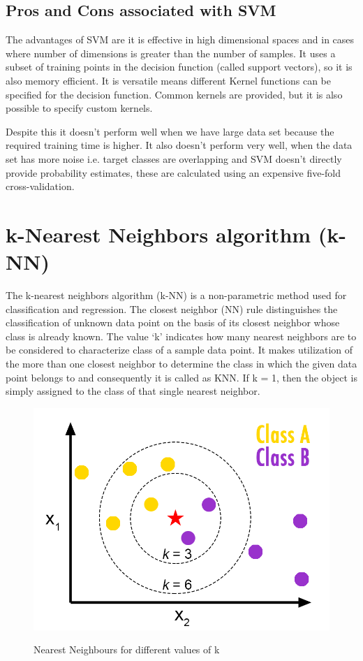 \subsection{Pros and Cons associated with SVM} \label{Pros and Cons associated with SVM}

\noindent The advantages of SVM are it is effective in high dimensional spaces and in cases where number of dimensions is greater than the number of samples. It uses a subset of training points in the decision function (called support vectors), so it is also memory efficient. It is versatile means different Kernel functions can be specified for the decision function. Common kernels are provided, but it is also possible to specify custom kernels. 

\noindent Despite this it doesn’t perform well when we have large data set because the required training time is higher. It also doesn’t perform very well, when the data set has more noise i.e. target classes are overlapping and SVM doesn’t directly provide probability estimates, these are calculated using an expensive five-fold cross-validation.




\section{k-Nearest Neighbors algorithm (k-NN)} \label{k-Nearest Neighbors algorithm (k-NN)}
\noindent The k-nearest neighbors algorithm (k-NN) is a non-parametric method used for classification and regression. The closest neighbor (NN) rule distinguishes the classification of unknown data point on the basis of its closest neighbor whose class is already known. The value ‘k’ indicates how many nearest neighbors are to be considered to characterize class of a sample data point. It makes utilization of the more than one closest neighbor to determine the class in which the given data point belongs to and consequently it is called as KNN. If k = 1, then the object is simply assigned to the class of that single nearest neighbor.


\begin{figure}[H]
\centering
{\includegraphics[scale=0.65]{knn.png}}
\caption{Nearest Neighbours for different values of k}
\end{figure}


